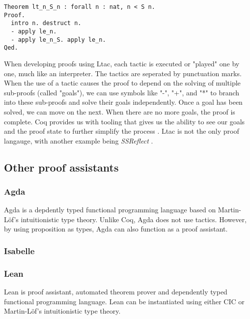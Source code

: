 \begin{minipage}{\linewidth}
\begin{lstlisting}[language=Coq, label={lst:ltac_ex}, caption={Example of Ltac syntax}]
Theorem lt_n_S_n : forall n : nat, n < S n.
Proof.
  intro n. destruct n.
  - apply le_n.
  - apply le_n_S. apply le_n.
Qed.
\end{lstlisting}
\end{minipage}

When developing proofs using Ltac, each tactic is executed or "played" one by one,
much like an interpreter. The tactics are seperated by punctuation marks.
When the use of a tactic causes the proof to depend on the solving of multiple sub-proofs (called "goals"),
we can use symbols like "-", "+", and "*" to branch into these sub-proofs and solve their goals independently.
Once a goal has been solved, we can move on the next. When there are no more goals, the proof is complete.
Coq provides us with tooling that gives us the ability to see our goals and the proof state
to further simplify the process \cite{cide}.
Ltac is not the only proof langauge, with another example being \textit{SSReflect} \cite{cssr}.

\subsection{Other proof assistants}

\subsubsection{Agda}

Agda is a depdently typed functional programming language based on Martin-Löf's
intuitionistic type theory. Unlike Coq, Agda does not use tactics. \cite{agdatut}
However, by using proposition as types, Agda can also function as a proof assistant.

\subsubsection{Isabelle}

\subsubsection{Lean}

Lean is proof assistant, automated theorem prover and dependently typed functional programming language.
Lean can be instantiated using either CIC or Martin-Löf's intuitionistic type theory.
\cite{lean}

